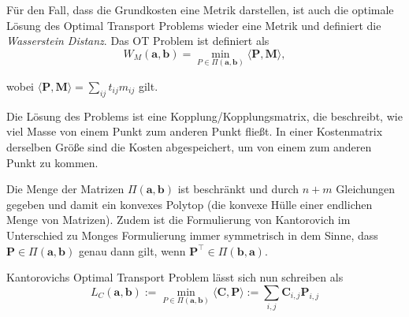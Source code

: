 \documentclass[11pt,a4paper]{article}
\numberwithin{equation}{section}
\begin{document}
	
	
	Für den Fall, dass die Grundkosten eine Metrik darstellen, ist auch die optimale Lösung des Optimal Transport Problems wieder eine Metrik \cite{cuturi2014ground} und definiert die \textit{Wasserstein Distanz}. Das OT Problem ist definiert als
	\begin{equation}
	W_M(\boldsymbol{a},\boldsymbol{b}) = \min_{P \in \Pi(\boldsymbol{a}, \boldsymbol{b})}{\langle \boldsymbol{P}, \boldsymbol{M} \rangle},
	\end{equation}
	
	wobei ${\langle \boldsymbol{P}, \boldsymbol{M} \rangle} = \sum_{ij}{t_{ij}m_{ij}}$ gilt.
	
	Die Lösung des Problems ist eine Kopplung/Kopplungsmatrix, die beschreibt, wie viel Masse von einem Punkt zum anderen Punkt fließt. In einer Kostenmatrix derselben Größe sind die Kosten abgespeichert, um von einem zum anderen Punkt zu kommen.
	
	Die Menge der Matrizen $\Pi(\boldsymbol{a}, \boldsymbol{b})$ ist beschränkt und durch $n+m$ Gleichungen gegeben und damit ein konvexes Polytop (die konvexe Hülle einer endlichen Menge von Matrizen). Zudem ist die Formulierung von Kantorovich im Unterschied zu Monges Formulierung immer symmetrisch in dem Sinne, dass $\boldsymbol{P} \in \Pi (\boldsymbol{a}, \boldsymbol{b})$ genau dann gilt, wenn $\boldsymbol{P}^\top \in \Pi (\boldsymbol{b}, \boldsymbol{a})$.
	
	Kantorovichs Optimal Transport Problem lässt sich nun schreiben als 
	\begin{equation}
	L_C(\boldsymbol{a}, \boldsymbol{b}) := \min_{P \in \Pi(\boldsymbol{a}, \boldsymbol{b})} \langle \boldsymbol{C}, \boldsymbol{P} \rangle := \sum_{i,j}{\boldsymbol{C}_{i,j}\boldsymbol{P}_{i,j}} \label{KOTP}
	\end{equation}
	
\end{document}
